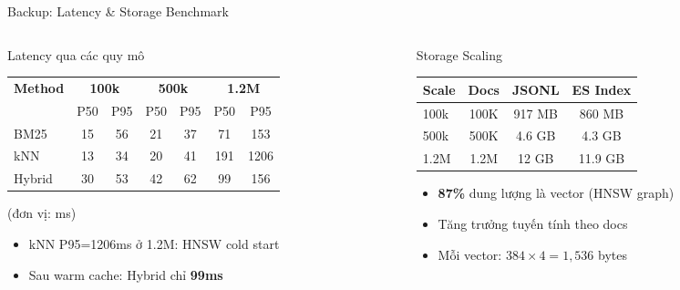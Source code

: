 \documentclass[aspectratio=169, 11pt]{beamer}
\begin{document}
\begin{frame}{Backup: Latency \& Storage Benchmark}
\begin{columns}[T]
\begin{column}{0.50\textwidth}

\begin{block}{Latency qua các quy mô}
\centering
{\scriptsize
\begin{tabular}{l *{6}{c}}
\toprule
\multirow{2}{*}{\textbf{Method}} & \multicolumn{2}{c}{\textbf{100k}} & \multicolumn{2}{c}{\textbf{500k}} & \multicolumn{2}{c}{\textbf{1.2M}} \\
\cmidrule(lr){2-3} \cmidrule(lr){4-5} \cmidrule(lr){6-7}
& P50 & P95 & P50 & P95 & P50 & P95 \\
\midrule
BM25 & 15 & 56 & 21 & 37 & 71 & 153 \\
kNN & 13 & 34 & 20 & 41 & 191 & 1206 \\
\rowcolor{highlightRow}
\textcolor{accentTeal}{Hybrid} & \textcolor{accentTeal}{30} & \textcolor{accentTeal}{53} & \textcolor{accentTeal}{42} & \textcolor{accentTeal}{62} & \textcolor{accentTeal}{99} & \textcolor{accentTeal}{156} \\
\bottomrule
\end{tabular}
}
{\scriptsize\textcolor{textLight}{(đơn vị: ms)}}
\end{block}

\vspace{0.1cm}
{\small
\begin{itemize}
    \item kNN P95=1206ms ở 1.2M: HNSW cold start
    \item Sau warm cache: Hybrid chỉ \textbf{99ms}
\end{itemize}
}

\end{column}
\begin{column}{0.46\textwidth}

\begin{block}{Storage Scaling}
\centering
{\scriptsize
\begin{tabular}{l c c c}
\toprule
\textbf{Scale} & \textbf{Docs} & \textbf{JSONL} & \textbf{ES Index} \\
\midrule
100k & 100K & 917 MB & 860 MB \\
500k & 500K & 4.6 GB & 4.3 GB \\
1.2M & 1.2M & 12 GB & 11.9 GB \\
\bottomrule
\end{tabular}
}
\end{block}

\vspace{0.1cm}
{\small
\begin{itemize}
    \item \textbf{87\%} dung lượng là vector (HNSW graph)
    \item Tăng trưởng tuyến tính theo docs
    \item Mỗi vector: $384 \times 4 = 1{,}536$ bytes
\end{itemize}
}

\end{column}
\end{columns}
\end{frame}
\end{document}

